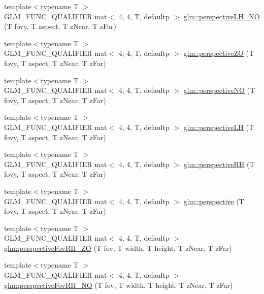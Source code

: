 \begin{DoxyCompactItemize}
\item 
{\footnotesize template$<$typename T $>$ }\\G\+L\+M\+\_\+\+F\+U\+N\+C\+\_\+\+Q\+U\+A\+L\+I\+F\+I\+ER mat$<$ 4, 4, T, defaultp $>$ \hyperlink{group__gtc__matrix__transform_gaead4d049d1feab463b700b5641aa590e}{glm\+::perspective\+L\+H\+\_\+\+NO} (T fovy, T aspect, T z\+Near, T z\+Far)
\item 
{\footnotesize template$<$typename T $>$ }\\G\+L\+M\+\_\+\+F\+U\+N\+C\+\_\+\+Q\+U\+A\+L\+I\+F\+I\+ER mat$<$ 4, 4, T, defaultp $>$ \hyperlink{group__gtc__matrix__transform_gaa9dfba5c2322da54f72b1eb7c7c11b47}{glm\+::perspective\+ZO} (T fovy, T aspect, T z\+Near, T z\+Far)
\item 
{\footnotesize template$<$typename T $>$ }\\G\+L\+M\+\_\+\+F\+U\+N\+C\+\_\+\+Q\+U\+A\+L\+I\+F\+I\+ER mat$<$ 4, 4, T, defaultp $>$ \hyperlink{group__gtc__matrix__transform_gaf497e6bca61e7c87088370b126a93758}{glm\+::perspective\+NO} (T fovy, T aspect, T z\+Near, T z\+Far)
\item 
{\footnotesize template$<$typename T $>$ }\\G\+L\+M\+\_\+\+F\+U\+N\+C\+\_\+\+Q\+U\+A\+L\+I\+F\+I\+ER mat$<$ 4, 4, T, defaultp $>$ \hyperlink{group__gtc__matrix__transform_ga9bd34951dc7022ac256fcb51d7f6fc2f}{glm\+::perspective\+LH} (T fovy, T aspect, T z\+Near, T z\+Far)
\item 
{\footnotesize template$<$typename T $>$ }\\G\+L\+M\+\_\+\+F\+U\+N\+C\+\_\+\+Q\+U\+A\+L\+I\+F\+I\+ER mat$<$ 4, 4, T, defaultp $>$ \hyperlink{group__gtc__matrix__transform_ga26b88757fbd90601b80768a7e1ad3aa1}{glm\+::perspective\+RH} (T fovy, T aspect, T z\+Near, T z\+Far)
\item 
{\footnotesize template$<$typename T $>$ }\\G\+L\+M\+\_\+\+F\+U\+N\+C\+\_\+\+Q\+U\+A\+L\+I\+F\+I\+ER mat$<$ 4, 4, T, defaultp $>$ \hyperlink{group__gtc__matrix__transform_ga747c8cf99458663dd7ad1bb3a2f07787}{glm\+::perspective} (T fovy, T aspect, T z\+Near, T z\+Far)
\item 
{\footnotesize template$<$typename T $>$ }\\G\+L\+M\+\_\+\+F\+U\+N\+C\+\_\+\+Q\+U\+A\+L\+I\+F\+I\+ER mat$<$ 4, 4, T, defaultp $>$ \hyperlink{group__gtc__matrix__transform_ga7dcbb25331676f5b0795aced1a905c44}{glm\+::perspective\+Fov\+R\+H\+\_\+\+ZO} (T fov, T width, T height, T z\+Near, T z\+Far)
\item 
{\footnotesize template$<$typename T $>$ }\\G\+L\+M\+\_\+\+F\+U\+N\+C\+\_\+\+Q\+U\+A\+L\+I\+F\+I\+ER mat$<$ 4, 4, T, defaultp $>$ \hyperlink{group__gtc__matrix__transform_ga257b733ff883c9a065801023cf243eb2}{glm\+::perspective\+Fov\+R\+H\+\_\+\+NO} (T fov, T width, T height, T z\+Near, T z\+Far)

\end{DoxyCompactItemize}
